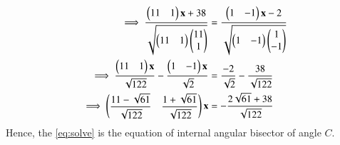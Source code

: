 \documentclass[journal,12pt,twocolumn]{IEEEtran}
\theoremstyle{remark}
\begin{document}
\begin{align}
\implies\dfrac{\begin{pmatrix}11&1\end{pmatrix}\mathbf{x}+38}{\sqrt{\begin{pmatrix}11&1\end{pmatrix}\begin{pmatrix}11\\1\end{pmatrix}}}&=\dfrac{\begin{pmatrix}1 &-1\end{pmatrix}\mathbf{x}-2}{\sqrt{\begin{pmatrix}1 &-1\end{pmatrix}\begin{pmatrix}1\\-1\end{pmatrix}}}\\
\implies\dfrac{\begin{pmatrix}11&1\end{pmatrix}\mathbf{x}}{\sqrt{122}} - \dfrac{\begin{pmatrix}1 &-1\end{pmatrix}\mathbf{x}}{\sqrt{2}}&=\dfrac{-2}{\sqrt{2}} - \dfrac{38}{\sqrt{122}}\\
\label{eq:solve}\implies\begin{pmatrix}\dfrac{11-\sqrt{61}}{\sqrt{122}} & \dfrac{1+\sqrt{61}}{\sqrt{122}}\end{pmatrix}\mathbf{x}&=-\dfrac{2\sqrt{61}+38}{\sqrt{122}}
\end{align}
Hence, the \eqref{eq:solve} is the equation of internal angular bisector of angle $C$.
\end{document}
